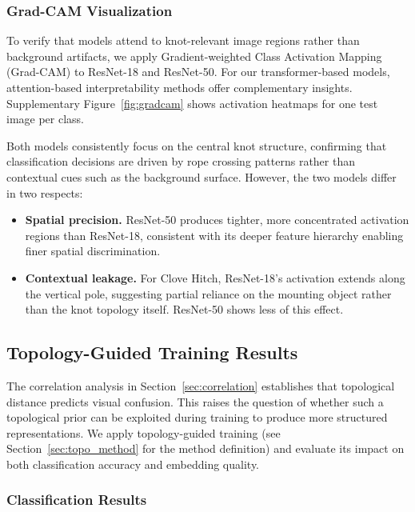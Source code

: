 \documentclass[preprint,review,12pt]{elsarticle}
\begin{document}
\subsubsection{Grad-CAM Visualization}
\label{sec:gradcam}

To verify that models attend to knot-relevant image regions rather than background artifacts, we apply Gradient-weighted Class Activation Mapping (Grad-CAM) \citep{selvaraju2017gradcam} to ResNet-18 and ResNet-50. For our transformer-based models, attention-based interpretability methods \citep{chefer2021transformer} offer complementary insights. Supplementary Figure~\ref{fig:gradcam} shows activation heatmaps for one test image per class.

Both models consistently focus on the central knot structure, confirming that classification decisions are driven by rope crossing patterns rather than contextual cues such as the background surface. However, the two models differ in two respects:

\begin{itemize}
    \item \textbf{Spatial precision.} ResNet-50 produces tighter, more concentrated activation regions than ResNet-18, consistent with its deeper feature hierarchy enabling finer spatial discrimination.
    \item \textbf{Contextual leakage.} For Clove Hitch, ResNet-18's activation extends along the vertical pole, suggesting partial reliance on the mounting object rather than the knot topology itself. ResNet-50 shows less of this effect.
\end{itemize}


\subsection{Topology-Guided Training Results}\label{sec:topo_results}

The correlation analysis in Section~\ref{sec:correlation} establishes that topological distance predicts visual confusion. This raises the question of whether such a topological prior can be exploited during training to produce more structured representations. We apply topology-guided training (see Section~\ref{sec:topo_method} for the method definition) and evaluate its impact on both classification accuracy and embedding quality.

\subsubsection{Classification Results}
\end{document}
